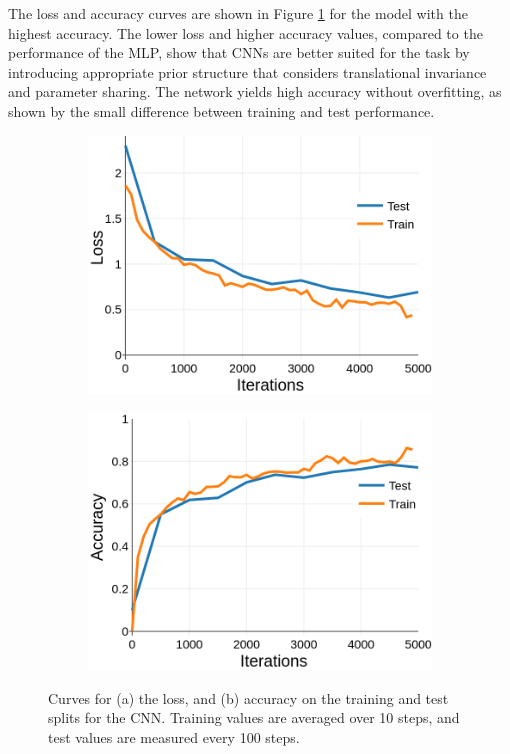\documentclass{article}
\begin{document}
The loss and accuracy curves are shown in Figure \ref{fig:convnet_curves} for the model with the highest accuracy. The lower loss and higher accuracy values, compared to the performance of the MLP, show that CNNs are better suited for the task by introducing appropriate prior structure that considers translational invariance and parameter sharing. The network yields high accuracy without overfitting, as shown by the small difference between training and test performance.

\begin{figure}[t]
\begin{subfigure}{0.49\textwidth}
\centering
\includegraphics[scale=0.22]{img/convnet-loss}
\caption{}
\end{subfigure}
\begin{subfigure}{0.49\textwidth}
\centering
\includegraphics[scale=0.22]{img/convnet-acc}
\caption{}
\end{subfigure}
 \caption{Curves for (a) the loss, and (b) accuracy on the training and test splits for the CNN. Training values are averaged over 10 steps, and test values are measured every 100 steps.}
\label{fig:convnet_curves}
\end{figure}



\end{document}
